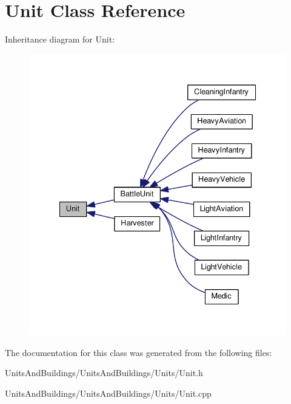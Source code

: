 \hypertarget{class_unit}{}\section{Unit Class Reference}
\label{class_unit}


Inheritance diagram for Unit\+:
\nopagebreak
\begin{figure}[H]
\begin{center}
\leavevmode
\includegraphics[width=335pt]{class_unit__inherit__graph}
\end{center}
\end{figure}


The documentation for this class was generated from the following files\+:\begin{DoxyCompactItemize}
\item 
Units\+And\+Buildings/\+Units\+And\+Buildings/\+Units/Unit.\+h\item 
Units\+And\+Buildings/\+Units\+And\+Buildings/\+Units/Unit.\+cpp\end{DoxyCompactItemize}
